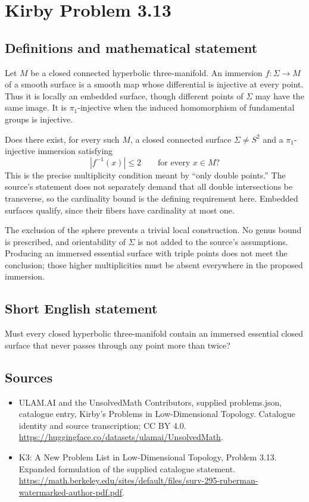 \documentclass[11pt,a4paper]{article}
\begin{document}
\section*{Kirby Problem 3.13}\label{statement}

\subsection{Definitions and mathematical statement}
Let $M$ be a closed connected hyperbolic three-manifold. An immersion
$f:\Sigma\to M$ of a smooth surface is a smooth map whose differential is
injective at every point. Thus it is locally an embedded surface, though
different points of $\Sigma$ may have the same image. It is $\pi_1$-injective
when the induced homomorphism of fundamental groups is injective.

Does there exist, for every such $M$, a closed connected surface
$\Sigma\ne S^2$ and a $\pi_1$-injective immersion satisfying
\[
 |f^{-1}(x)|\leq2\qquad\text{for every }x\in M?
\]
This is the precise multiplicity condition meant by ``only double points.''
The source's statement does not separately demand that all double intersections
be transverse, so the cardinality bound is the defining requirement here.
Embedded surfaces qualify, since their fibers have cardinality at most one.

The exclusion of the sphere prevents a trivial local construction. No genus
bound is prescribed, and orientability of $\Sigma$ is not added to the
source's assumptions. Producing an immersed essential surface with triple
points does not meet the conclusion; those higher multiplicities must be
absent everywhere in the proposed immersion.
\subsection{Short English statement}
Must every closed hyperbolic three-manifold contain an immersed essential closed surface that never passes through any point more than twice?
\subsection{Sources}
\begin{itemize}
\item[S1] ULAM.AI and the UnsolvedMath Contributors, supplied problems.json, catalogue entry, Kirby's Problems in Low-Dimensional Topology. Catalogue identity and source transcription; CC BY 4.0.
\url{https://huggingface.co/datasets/ulamai/UnsolvedMath}.
\item[S2] K3: A New Problem List in Low-Dimensional Topology, Problem 3.13. Expanded formulation of the supplied catalogue statement.
\url{https://math.berkeley.edu/sites/default/files/surv-295-ruberman-watermarked-author-pdf.pdf}.
\end{itemize}
\end{document}
